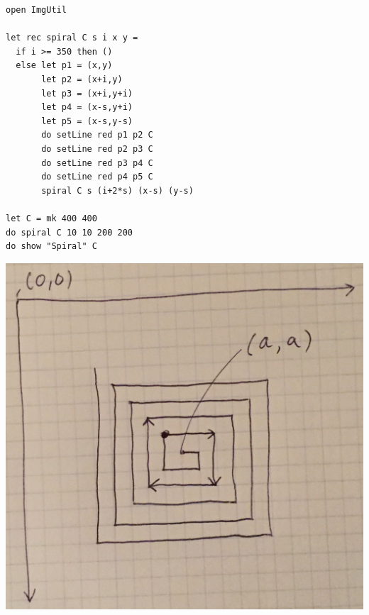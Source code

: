 \documentclass[rgb]{beamer}
\begin{document}
\begin{frame}[fragile]
\begin{footnotesize}

  \vspace{1ex}

  \begin{minipage}[b]{0.65\textwidth}
\begin{lstlisting}[numbers=none,frame=none,mathescape]
open ImgUtil

let rec spiral C s i x y =
  if i >= 350 then ()
  else let p1 = (x,y)
       let p2 = (x+i,y)
       let p3 = (x+i,y+i)
       let p4 = (x-s,y+i)
       let p5 = (x-s,y-s)
       do setLine red p1 p2 C
       do setLine red p2 p3 C
       do setLine red p3 p4 C
       do setLine red p4 p5 C
       spiral C s (i+2*s) (x-s) (y-s)

let C = mk 400 400
do spiral C 10 10 200 200
do show "Spiral" C
\end{lstlisting}
  \end{minipage}\hfill\begin{minipage}[b]{0.3\textwidth}

  \includegraphics[width=\textwidth]{../images/spiral.jpg}

  \vspace{3cm}
  \end{minipage}

\end{footnotesize}
\end{frame}
\end{document}
